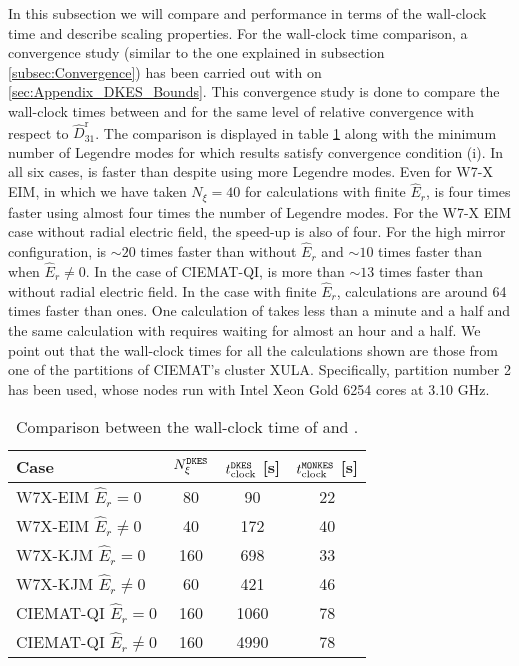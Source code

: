  In this subsection we will compare {\MONKES} and {\DKES} performance in terms of the wall-clock time and describe {\MONKES} scaling properties. For the wall-clock time comparison, a convergence study (similar to the one explained in subsection \ref{subsec:Convergence}) has been carried out with {\DKES} on \ref{sec:Appendix_DKES_Bounds}. This convergence study is done to compare the wall-clock times between {\MONKES} and {\DKES} for the same level of relative convergence with respect to $\widehat{D}_{31}^{\text{r}}$. The comparison is displayed in table \ref{tab:DKES_MONKES_Comparison} along with the minimum number of Legendre modes for which {\DKES} results satisfy convergence condition (i). In all six cases, {\MONKES} is faster than {\DKES} despite using more Legendre modes. Even for W7-X EIM, in which we have taken $N_\xi =40$ for {\DKES} calculations with finite $\widehat{E}_r$, {\MONKES} is four times faster using almost four times the number of Legendre modes. For the W7-X EIM case without radial electric field, the speed-up is also of four. For the high mirror configuration, {\MONKES} is $\sim 20$ times faster than {\DKES} without $\hat{E}_r$ and $\sim 10$ times faster than {\DKES} when $\hat{E}_r \ne 0$. In the case of CIEMAT-QI, {\MONKES} is more than $\sim 13$ times faster than {\DKES} without radial electric field. In the case with finite $\hat{E}_r$, {\MONKES} calculations are around 64 times faster than {\DKES} ones. One calculation of {\MONKES} takes less than a minute and a half and the same calculation with {\DKES} requires waiting for almost an hour and a half. We point out that the wall-clock times for all the calculations shown are those from one of the partitions of CIEMAT's cluster XULA. Specifically, partition number 2 has been used, whose nodes run with Intel Xeon Gold 6254 cores at 3.10 GHz. 
 
 \begin{table}[h]
 	\centering
 	\begin{tabular}{lccc}
 		\toprule
 		Case   & $N_\xi^{{\texttt{DKES}}}$ & $t_{\text{clock}}^{{\texttt{DKES}}}$  [s] & $t_{\text{clock}}^{{\texttt{MONKES}}}$  {[}s{]} \\ \midrule
 		W7X-EIM $\hat{E}_r=0$                                   & 80          &  90      &         22      \\
 		W7X-EIM $\hat{E}_r\ne 0$                                & {40}          &  {172}     &         40      \\ 
 		W7X-KJM $\hat{E}_r=0$                                   & 160         &  698     &         33      \\
 		W7X-KJM $\hat{E}_r\ne 0$                                & 60          &  421     &         46      \\
 		CIEMAT-QI $\hat{E}_r=0$                                 & 160         &  1060    &         78      \\
 		CIEMAT-QI $\hat{E}_r\ne 0$                              & 160         &  4990    &         78                    \\\bottomrule
 	\end{tabular}
 	\caption{Comparison between the wall-clock time of {\DKES} and {\MONKES}.}
 	\label{tab:DKES_MONKES_Comparison}
 \end{table}
 
